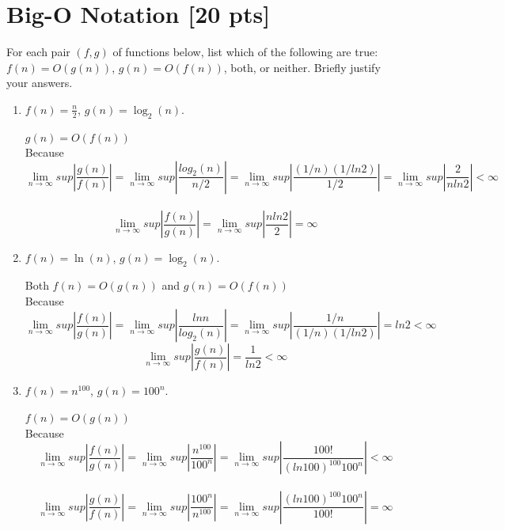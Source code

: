 \documentclass[a4paper]{article}
\theoremstyle{definition}
\newenvironment{soln}{
    \leavevmode\color{blue}\ignorespaces
}{}
\begin{document}
\section{Big-O Notation [20 pts]}
For each pair $(f, g)$ of functions below, list which of the following
are true: $f(n) = O(g(n))$, $g(n) = O(f(n))$, both, or
neither. Briefly justify your answers.
\begin{enumerate}
	\item 	$f(n) = \frac{n}{2}$, $g(n) = \log_{2}(n)$.\\
	    \begin{soln}
	    $g(n) = O(f(n))$ \\
	    Because
	    $$
	    { \lim_{n \to \infty} sup|\frac{g(n)}{f(n)}|} = { \lim_{n \to \infty} sup|\frac{log_2(n)}{n/2}|} 
	    = { \lim_{n \to \infty} sup|\frac{(1/n)(1/ln2)}{1/2}|} = { \lim_{n \to \infty} sup|\frac{2}{nln2}|} < \infty
	    $$ \\
	    $$
	    { \lim_{n \to \infty} sup|\frac{f(n)}{g(n)}|} = { \lim_{n \to \infty} sup|\frac{nln2}{2}|} = \infty
	    $$
	    \end{soln}
	\item 	$f(n) = \ln(n)$, $g(n) = \log_{2}(n)$.\\
	    \begin{soln}
	    Both $f(n) = O(g(n))$ and $g(n) = O(f(n))$\\
	    Because
	    $$
	    { \lim_{n \to \infty} sup|\frac{f(n)}{g(n)}|} = { \lim_{n \to \infty} sup|\frac{lnn}{log_2(n)}|} 
	    = { \lim_{n \to \infty} sup|\frac{1/n}{(1/n)(1/ln2)}|} = ln2 < \infty
	    $$
	    $$
	    { \lim_{n \to \infty} sup|\frac{g(n)}{f(n)}|} = \frac{1}{ln2} < \infty
	    $$
	    \end{soln}
	\item 	$f(n) = n^{100}$, $g(n) = 100^n$.\\
	    \begin{soln}
	    $f(n) = O(g(n))$ \\
	    Because
	    $$
	    { \lim_{n \to \infty} sup|\frac{f(n)}{g(n)}|} = { \lim_{n \to \infty} sup|\frac{n^{100}}{100^n}|} 
	    = { \lim_{n \to \infty} sup|\frac{100!}{(ln100)^{100}100^n}|} < \infty
	    $$ \\
	    $$
	    { \lim_{n \to \infty} sup|\frac{g(n)}{f(n)}|} = { \lim_{n \to \infty} sup|\frac{100^n}{n^{100}}|} 
	    = { \lim_{n \to \infty} sup|\frac{(ln100)^{100}100^n}{100!}|}= \infty
	    $$
	    \end{soln}
\end{enumerate}
\end{document}
